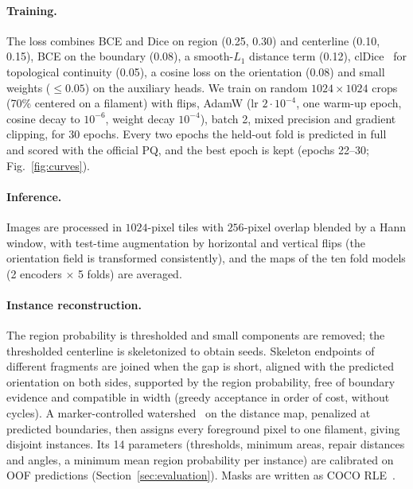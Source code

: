 \paragraph{Training.}
The loss combines BCE and Dice on region (0.25, 0.30) and centerline (0.10,
0.15), BCE on the boundary (0.08), a smooth-$L_1$ distance term (0.12),
clDice~\cite{shit2021cldice} for topological continuity (0.05), a cosine
loss on the orientation (0.08) and small weights ($\le0.05$) on the
auxiliary heads. We train on random $1024\times1024$ crops (70\% centered on
a filament) with flips, AdamW (lr $2\cdot10^{-4}$, one warm-up epoch, cosine
decay to $10^{-6}$, weight decay $10^{-4}$), batch 2, mixed precision and
gradient clipping, for 30 epochs. Every two epochs the held-out fold is
predicted in full and scored with the official PQ, and the best epoch is
kept (epochs 22--30; Fig.~\ref{fig:curves}).

\paragraph{Inference.}
Images are processed in $1024$-pixel tiles with $256$-pixel overlap blended
by a Hann window, with test-time augmentation by horizontal and vertical
flips (the orientation field is transformed consistently), and the maps of
the ten fold models (2 encoders $\times$ 5 folds) are averaged.

\paragraph{Instance reconstruction.}
The region probability is thresholded and small components are removed; the
thresholded centerline is skeletonized to obtain seeds. Skeleton endpoints of
different fragments are joined when the gap is short, aligned with the
predicted orientation on both sides, supported by the region probability,
free of boundary evidence and compatible in width (greedy acceptance in order
of cost, without cycles). A marker-controlled
watershed~\cite{beucher1993watershed} on the distance map, penalized at
predicted boundaries, then assigns every foreground pixel to one filament,
giving disjoint instances. Its 14 parameters (thresholds, minimum areas,
repair distances and angles, a minimum mean region probability per instance)
are calibrated on OOF predictions (Section~\ref{sec:evaluation}). Masks are
written as COCO RLE~\cite{lin2014coco}.

